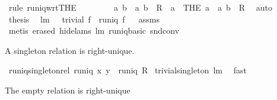 \begin{isabellebody}
\ {\isacharparenleft}rule\ runiq{\isacharunderscore}wrt{\isacharunderscore}THE{\isacharparenright}\isanewline
\ \ \isamarkupfalse%
\ \isamarkupfalse%
\ {\isachardoublequoteopen}{\isasymdots}\ {\isasymlongleftrightarrow}\ {\isacharparenleft}{\isasymforall}\ a\ b\ {\isachardot}\ {\isacharparenleft}a{\isacharcomma}\ b{\isacharparenright}\ {\isasymin}\ R\ {\isasymlongrightarrow}\ a\ {\isacharequal}\ {\isacharparenleft}THE\ a\ {\isachardot}\ {\isacharparenleft}a{\isacharcomma}\ b{\isacharparenright}\ {\isasymin}\ R{\isacharparenright}{\isacharparenright}{\isachardoublequoteclose}\ \isamarkupfalse%
\ auto\isanewline
\ \ \isamarkupfalse%
\ \isamarkupfalse%
\ {\isacharquery}thesis\ \isacommand{{\isachardot}}\isamarkupfalse%
\isanewline
{}\isamarkupfalse%
%
\endisatagproof
{\isafoldproof}%
%
\isadelimproof
\isanewline
%
\endisadelimproof
\isanewline
{}\isamarkupfalse%
\ lm{}{}{}{\isacharcolon}\ \ \ {\isachardoublequoteopen}trivial\ f{\isachardoublequoteclose}\ \ {\isachardoublequoteopen}runiq\ f{\isachardoublequoteclose}%
\isadelimproof
\ %
\endisadelimproof
%
\isatagproof
{}\isamarkupfalse%
\ assms\ \isamarkupfalse%
\ {\isacharparenleft}metis\ {\isacharparenleft}erased{\isacharcomma}\ hide{\isacharunderscore}lams{\isacharparenright}\ lm{}{}\ runiq{\isacharunderscore}basic\ snd{\isacharunderscore}conv{\isacharparenright}%
\endisatagproof
{\isafoldproof}%
%
\isadelimproof
%
\endisadelimproof
%
\begin{isamarkuptext}%
A singleton relation is right-unique.%
\end{isamarkuptext}%
\isamarkuptrue%
\isamarkupfalse%
\ runiq{\isacharunderscore}singleton{\isacharunderscore}rel{\isacharcolon}\ {\isachardoublequoteopen}runiq\ {\isacharbraceleft}{\isacharparenleft}x{\isacharcomma}\ y{\isacharparenright}{\isacharbraceright}{\isachardoublequoteclose}\ {\isacharparenleft}\ {\isachardoublequoteopen}runiq\ {\isacharquery}R{\isachardoublequoteclose}{\isacharparenright}\isanewline
%
\isadelimproof
%
\endisadelimproof
%
\isatagproof
{}\isamarkupfalse%
\ trivial{\isacharunderscore}singleton\ lm{}{}{}\ \isamarkupfalse%
\ fast%
\endisatagproof
{\isafoldproof}%
%
\isadelimproof
%
\endisadelimproof
%
\begin{isamarkuptext}%
The empty relation is right-unique%

\end{isamarkuptext}
\end{isabellebody}
